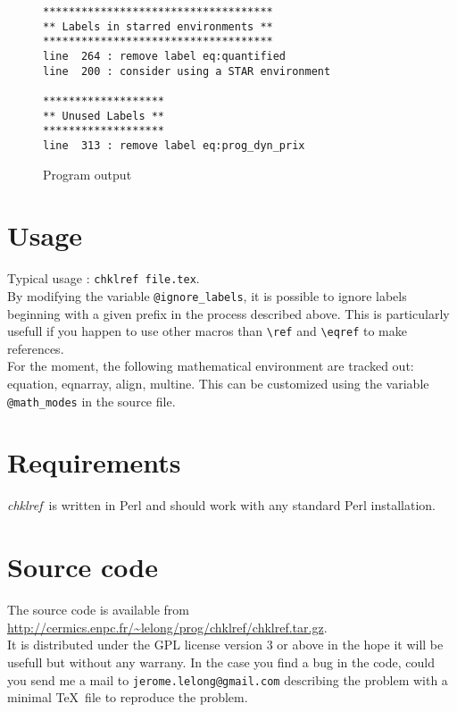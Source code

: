 \documentclass[a4paper,11pt,twoside]{article}
\def\chk{{\it chklref}}
\def\endpage{}%
\def\endpage{\HCode{</div>}}%
\begin{document}
\begin{figure}[htbp]
  \centering
\begin{verbatim}
************************************
** Labels in starred environments **
************************************
line  264 : remove label eq:quantified
line  200 : consider using a STAR environment

*******************
** Unused Labels **
*******************
line  313 : remove label eq:prog_dyn_prix
\end{verbatim}
  \caption{Program output}
  \label{fig:output}
\end{figure}


\section{Usage}

Typical usage : \verb!chklref file.tex!.
\\

\noindent By modifying the variable \verb!@ignore_labels!, it is possible to ignore labels
beginning with a given prefix in the process described above. This is
particularly usefull if you happen to use other macros than \verb!\ref! and
\verb!\eqref! to make references.
\\

\noindent For the moment, the following mathematical environment are tracked out:
equation, eqnarray, align, multine. This can be customized using the variable
\verb!@math_modes! in the source file.

\section{Requirements}

\chk\ is written in Perl and should work with any standard Perl
installation.


\section{Source code}

The source code is available from
\url{http://cermics.enpc.fr/~lelong/prog/chklref/chklref.tar.gz}.
\\

\noindent It is distributed under the GPL license version 3 or above in the
hope it will be usefull but without any warrany. In the case you find a bug in
the code, could you send me a mail to \verb!jerome.lelong@gmail.com! describing
the problem with a minimal \TeX\ file to reproduce the problem.

\endpage
\end{document}
